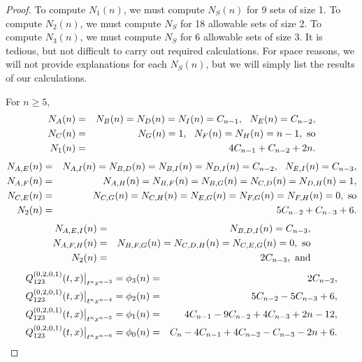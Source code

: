 \documentclass[
final,nomarks
]{dmtcs-episciences}
\newcommand{\Qm}[1]{Q_{123}^{(#1)}(t,x)}
\begin{document}
\begin{proof}
	
	To compute \begin{math}N_1(n)\end{math}, we must compute \begin{math}N_S(n)\end{math} for 9 sets of size 1. To compute 
	\begin{math}N_2(n)\end{math}, we must compute \begin{math}N_{S}\end{math} for 18 allowable sets of size 2. To compute 
	\begin{math}N_3(n)\end{math}, we must compute \begin{math}N_{S}\end{math} for 6 allowable sets of size 3. It is tedious, but 
	not difficult to carry out required calculations. For space reasons, 
	we will not provide explanations 
	for each \begin{math}N_S(n)\end{math}, but we will simply list the results of our calculations. 
	
	For \begin{math}n\geq 5\end{math},
	\begin{eqnarray}
		N_A(n)&=&N_B(n)=N_D(n)=N_I(n)=C_{n-1}, \ \ N_E(n)=C_{n-2}, \\
		N_C(n)&=&N_G(n)=1, \ \ N_F(n)=N_H(n)=n-1, \ \textnormal{so}\\
		N_1(n)&=&4C_{n-1}+C_{n-2}+2n.
	\end{eqnarray}
	\begin{eqnarray}
		N_{A,E}(n)&=&N_{A,I}(n)=N_{B,D}(n)=N_{B,I}(n)=N_{D,I}(n)=C_{n-2}, \ \ N_{E,I}(n)=C_{n-3}, \\
		N_{A,F}(n)&=&N_{A,H}(n)=N_{B,F}(n)=N_{B,G}(n)=N_{C,D}(n)=N_{D,H}(n)=1, \\
		N_{C,E}(n)&=&N_{C,G}(n)=N_{C,H}(n)=N_{E,G}(n)=N_{F,G}(n)=N_{F,H}(n)=0, \ \textnormal{so}\\
		N_2(n)&=&5C_{n-2}+C_{n-3}+6.
	\end{eqnarray}
	\begin{eqnarray}
		N_{A,E,I}(n)&=&N_{B,D,I}(n)=C_{n-3},\\
		N_{A,F,H}(n)&=&N_{B,F,G}(n)=N_{C,D,H}(n)=N_{C,E,G}(n)=0, \ \textnormal{so}\\
		N_2(n)&=&2C_{n-3}, \ \textnormal{and}
	\end{eqnarray}
	\begin{eqnarray}
		\Qm{0,2,0,1}\big|_{t^n x^{n-3}}=\phi_3(n)&=&2C_{n-2},\\
		\Qm{0,2,0,1}\big|_{t^n x^{n-4}}=\phi_2(n)&=&5C_{n-2}-5C_{n-3}+6,\\
		\Qm{0,2,0,1}\big|_{t^n x^{n-5}}=\phi_1(n)&=&4C_{n-1}-9C_{n-2}+4C_{n-3}+2n-12,\\
		\Qm{0,2,0,1}\big|_{t^n x^{n-6}}=\phi_0(n)&=&C_n-4C_{n-1}+4C_{n-2}-C_{n-3}-2n+6. \qedhere
	\end{eqnarray}
\end{proof}
\end{document}
